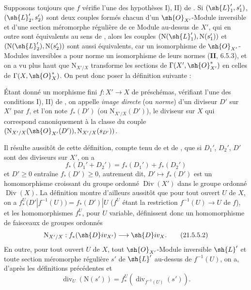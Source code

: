 \begin{env}[21.5.4]
\label{IV.21.5.4}
Supposons toujours que $f$ vérifie l'une des hypothèses I), II) de .
Si $(\sh{L}_1',s_1')$, $(\sh{L}_2',s_2')$ sont deux couples formés chacun d'un $\sh{O}_{X'}$-Module inversible et d'une section méromorphe régulière de ce Module au-dessus de $X'$, qui en outre sont équivalents au sens de , alors les couples $(\mathrm{N}(\sh{L}_1'),\mathrm{N}(s_1'))$ et $(\mathrm{N}(\sh{L}_2'),\mathrm{N}(s_2'))$ sont aussi équivalents, car un isomorphisme de $\sh{O}_{X'}$-Modules inversibles a pour norme un isomorphisme de leurs normes (\textbf{II}, 6.5.3), et on a vu plus haut que $\mathrm{N}_{X'/X}$ transforme les sections de $\Gamma(X',\sh{O}_{X'}^*)$ en celles de $\Gamma(X,\sh{O}_X^*)$.
On peut donc poser la définition suivante :
\end{env}


\begin{definition}[21.5.5]
Étant donné un morphisme fini $f:X'\to X$ de préschémas, vérifiant l'une des conditions I), II) de , on appelle \emph{image directe} (ou \emph{norme}) d'un diviseur $D'$ sur $X'$ par $f$, et l'on note $f_*(D')$ (ou $\mathrm{N}_{X'/X}(D')$), le diviseur sur $X$ qui correspond canoniquement  à la classe du couple $(\mathrm{N}_{X'/X}(\sh{O}_{X'}(D')),\mathrm{N}_{X'/X}(s_{D'}))$.
\end{definition}

Il résulte aussitôt de cette définition, compte tenu de  et de , que si $D_1'$, $D_2'$, $D'$ sont des diviseurs sur $X'$, on a
\[
\label{IV.21.5.5.1}
  f_*(D_1'+D_2')=f_*(D_1')+f_*(D_2')
  \tag{21.5.5.1}
\]
et $D'\geq0$ entraîne $f_*(D')\geq0$, autrement dit, $D'\mapsto f_*(D')$ est un homomorphisme croissant du groupe ordonné $\operatorname{Div}(X')$ dans le groupe ordonné $\operatorname{Div}(X)$.
La définition  montre d'ailleurs aussitôt que pour tout ouvert $U$ de $X$, on a $f_*^U(D'|f^{-1}(U))=f_*(D')|U$ ($f^U$ étant la restriction $f^{-1}(U)\to U$ de $f$), et les homomorphismes $f_*^U$, pour $U$ variable, définissent donc un homomorphisme de faisceaux de groupes ordonnés
\[
\label{IV.21.5.5.2}
  \mathrm{N}_{X'/X}:f_*(\sh{D}iv_{X'})\to\sh{D}iv_X.
  \tag{21.5.5.2}
\]
En outre, pour tout ouvert $U$ de $X$, tout $\sh{O}_{X'}$-Module inversible $\sh{L}'$ et toute section méromorphe régulière $s'$ de $\sh{L}'$ au-dessus de $f^{-1}(U)$, on a, d'après les définitions précédentes et 
\[
\label{IV.21.5.5.3}
  \operatorname{div}_U(\mathrm{N}(s'))=f_*^U(\operatorname{div}_{f^{-1}(U)}(s')).
  \tag{21.5.5.3}
\]

